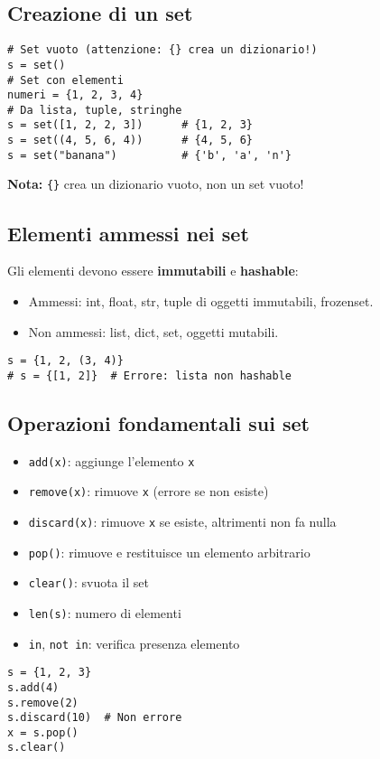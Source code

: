 \documentclass[a4paper,12pt]{article}
\begin{document}
\subsection*{Creazione di un set}
\begin{lstlisting}
# Set vuoto (attenzione: {} crea un dizionario!)
s = set()
# Set con elementi
numeri = {1, 2, 3, 4}
# Da lista, tuple, stringhe
s = set([1, 2, 2, 3])      # {1, 2, 3}
s = set((4, 5, 6, 4))      # {4, 5, 6}
s = set("banana")          # {'b', 'a', 'n'}
\end{lstlisting}
\textbf{Nota:} \texttt{\{\}} crea un dizionario vuoto, non un set vuoto!

\subsection*{Elementi ammessi nei set}
Gli elementi devono essere \textbf{immutabili} e \textbf{hashable}:
\begin{itemize}
    \item Ammessi: int, float, str, tuple di oggetti immutabili, frozenset.
    \item Non ammessi: list, dict, set, oggetti mutabili.
\end{itemize}
\begin{lstlisting}
s = {1, 2, (3, 4)}
# s = {[1, 2]}  # Errore: lista non hashable
\end{lstlisting}

\subsection*{Operazioni fondamentali sui set}
\begin{itemize}
    \item \texttt{add(x)}: aggiunge l'elemento \texttt{x}
    \item \texttt{remove(x)}: rimuove \texttt{x} (errore se non esiste)
    \item \texttt{discard(x)}: rimuove \texttt{x} se esiste, altrimenti non fa nulla
    \item \texttt{pop()}: rimuove e restituisce un elemento arbitrario
    \item \texttt{clear()}: svuota il set
    \item \texttt{len(s)}: numero di elementi
    \item \texttt{in}, \texttt{not in}: verifica presenza elemento
\end{itemize}
\begin{lstlisting}
s = {1, 2, 3}
s.add(4)
s.remove(2)
s.discard(10)  # Non errore
x = s.pop()
s.clear()
\end{lstlisting}
\end{document}

